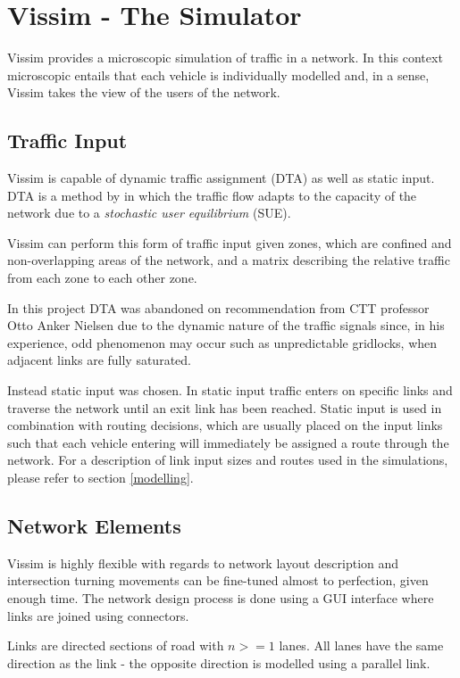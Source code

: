 \section{Vissim - The Simulator}
Vissim provides a microscopic simulation of traffic in a network. In this context microscopic entails that each vehicle is individually modelled and, in a sense, Vissim takes the view of the users of the network.

\subsection{Traffic Input}
Vissim is capable of dynamic traffic assignment (DTA) as well as static input. DTA is a method by \cite{Wardrop} in which the traffic flow adapts to the capacity of the network due to a \textit{stochastic user equilibrium} (SUE). 

Vissim can perform this form of traffic input given zones, which are confined and non-overlapping areas of the network, and a matrix describing the relative traffic from each zone to each other zone.

In this project DTA was abandoned on recommendation from CTT professor Otto Anker Nielsen due to the dynamic nature of the traffic signals since, in his experience, odd phenomenon may occur such as unpredictable gridlocks, when adjacent links are fully saturated.

Instead static input was chosen. In static input traffic enters on specific links and traverse the network until an exit link has been reached. Static input is used in combination with routing decisions, which are usually placed on the input links such that each vehicle entering will immediately be assigned a route through the network. For a description of link input sizes and routes used in the simulations, please refer to section \ref{modelling}.

\subsection{Network Elements}

Vissim is highly flexible with regards to network layout description and intersection turning movements can be fine-tuned almost to perfection, given enough time. The network design process is done using a GUI interface where links are joined using connectors.

Links are directed sections of road with $n>=1$ lanes. All lanes have the same direction as the link - the opposite direction is modelled using a parallel link.


